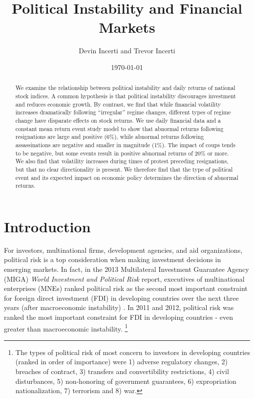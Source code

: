 \documentclass[12pt,final,fleqn]{article}
\theoremstyle{plain}
\begin{document}
\author{Devin Incerti and Trevor Incerti}
\title{\textbf{Political Instability and Financial Markets}}
\date{\today}
\maketitle

\singlespacing
\begin{abstract}
We examine the relationship between political instability and daily returns of national stock indices. A common hypothesis is that political instability discourages investment and reduces economic growth. By contrast, we find that while financial volatility increases dramatically following ``irregular'' regime changes, different types of regime change have disparate effects on stock returns. We use daily financial data and a constant mean return event study model to show that abnormal returns following resignations are large and positive (6\%), while abnormal returns following assassinations are negative and smaller in magnitude (1\%). The impact of coups tends to be negative, but some events result in positive abnormal returns of 20\% or more. We also find that volatility increases during times of protest preceding resignations, but that no clear directionality is present. We therefore find that the type of political event and its expected impact on economic policy determines the direction of abnormal returns.
\end{abstract}
\doublespacing

\section{Introduction} \label{sec:Introduction}
For investors, multinational firms, development agencies, and aid organizations, political risk is a top consideration when making investment decisions in emerging markets. In fact, in the 2013 Multilateral Investment Guarantee Agency (MIGA) \textit{World Investment and Political Risk} report, executives of multinational enterprises (MNEs) ranked political risk as the second most important constraint for foreign direct investment (FDI) in developing countries over the next three years (after macroeconomic instability) \citep{wipr2013}. In 2011 and 2012, political risk was ranked the most important constraint for FDI in developing countries - even greater than macroeconomic instability. \footnote{The types of political risk of most concern to investors in developing countries (ranked in order of importance) were 1) adverse regulatory changes, 2) breaches of contract, 3) transfers and convertibility restrictions, 4) civil disturbances, 5) non-honoring of government guarantees, 6) expropriation nationalization, 7) terrorism and 8) war.}
\end{document}
